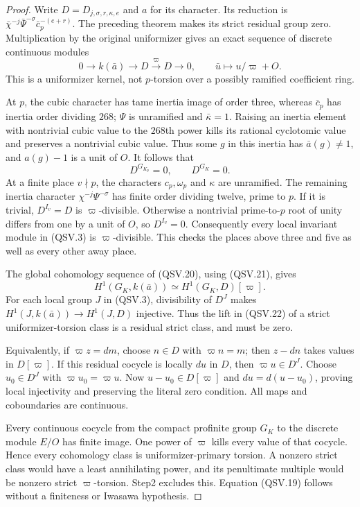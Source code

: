 \begin{proof}
Write \(D=D_{j,\sigma,r,\kappa,e}\) and \(a\) for its character.
Its reduction is
\(\bar\chi^{-j}\bar\Psi^{-\sigma}\bar c_p^{-(e+r)}\).
The preceding theorem makes its strict residual group zero.
Multiplication by the original uniformizer gives an exact
sequence of discrete continuous modules
\[
   0\longrightarrow k(\bar a)
    \longrightarrow D\xrightarrow{\varpi}D\longrightarrow0,
   \qquad
   \bar u\longmapsto u/\varpi+O .
 \tag{QSV.20}
\]
This is a uniformizer kernel, not \(p\)-torsion over a possibly
ramified coefficient ring.

At \(p\), the cubic character has tame inertia image of order
three, whereas \(\bar c_p\) has inertia order dividing \(268\);
\(\Psi\) is unramified and \(\bar\kappa=1\).
Raising an inertia element with nontrivial cubic value to the
\(268\)th power kills its rational cyclotomic value and preserves
a nontrivial cubic value.  Thus some \(g\) in this inertia has
\(\bar a(g)\ne1\), and \(a(g)-1\) is a unit of \(O\).
It follows that
\[
                  D^{G_{K_p}}=0,\qquad D^{G_K}=0 .
 \tag{QSV.21}
\]
At a finite place \(v\nmid p\), the characters \(c_p,\omega_p\)
and \(\kappa\) are unramified.  The remaining inertia character
\(\chi^{-j}\Psi^{-\sigma}\) has finite order dividing twelve,
prime to \(p\).  If it is trivial, \(D^{I_v}=D\) is
\(\varpi\)-divisible.  Otherwise a nontrivial prime-to-\(p\)
root of unity differs from one by a unit of \(O\), so \(D^{I_v}=0\).
Consequently every local invariant module in (QSV.3) is
\(\varpi\)-divisible.  This checks the places above three and
five as well as every other away place.

The global cohomology sequence of (QSV.20), using (QSV.21), gives
\[
       H^1(G_K,k(\bar a))\simeq H^1(G_K,D)[\varpi].
 \tag{QSV.22}
\]
For each local group \(J\) in (QSV.3), divisibility of \(D^J\)
makes \(H^1(J,k(\bar a))\to H^1(J,D)\) injective.
Thus the lift in (QSV.22) of a strict uniformizer-torsion class
is a residual strict class, and must be zero.

Equivalently, if \(\varpi z=dm\), choose \(n\in D\) with
\(\varpi n=m\); then \(z-dn\) takes values in \(D[\varpi]\).
If this residual cocycle is locally \(du\) in \(D\), then
\(\varpi u\in D^J\).  Choose \(u_0\in D^J\) with
\(\varpi u_0=\varpi u\).  Now \(u-u_0\in D[\varpi]\) and
\(du=d(u-u_0)\), proving local injectivity and preserving the
literal zero condition.  All maps and coboundaries are continuous.

Every continuous cocycle from the compact profinite group \(G_K\)
to the discrete module \(E/O\) has finite image.  One power of
\(\varpi\) kills every value of that cocycle.  Hence every
cohomology class is uniformizer-primary torsion.
A nonzero strict class would have a least annihilating power,
and its penultimate multiple would be nonzero strict
\(\varpi\)-torsion.  Step2 excludes this.  Equation (QSV.19)
follows without a finiteness or Iwasawa hypothesis.
\end{proof}

